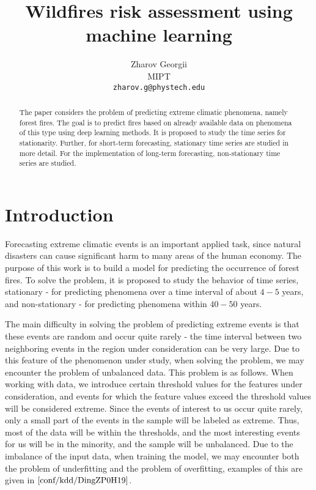 \documentclass{article}
\title{Wildfires risk assessment using machine learning}
\author{ Zharov Georgii\\
MIPT\\
	\texttt{zharov.g@phystech.edu} \\
}
\date{}
\begin{document}
\maketitle

\begin{abstract}



The paper considers the problem of predicting extreme climatic phenomena, namely forest fires. The goal is to predict fires based on already available data on phenomena of this type using deep learning methods. It is proposed to study the time series for stationarity. Further, for short-term forecasting, stationary time series are studied in more detail. For the implementation of long-term forecasting, non-stationary time series are studied.
\end{abstract}



\section{Introduction}


Forecasting extreme climatic events is an important applied task, since natural disasters can cause significant harm to many areas of the human economy. The purpose of this work is to build a model for predicting the occurrence of forest fires. To solve the problem, it is proposed to study the behavior of time series, stationary - for predicting phenomena over a time interval of about $4-5$ years, and non-stationary - for predicting phenomena within $40-50$ years.

The main difficulty in solving the problem of predicting extreme events is that these events are random and occur quite rarely - the time interval between two neighboring events in the region under consideration can be very large. Due to this feature of the phenomenon under study, when solving the problem, we may encounter the problem of unbalanced data. This problem is as follows. When working with data, we introduce certain threshold values for the features under consideration, and events for which the feature values exceed the threshold values will be considered extreme. Since the events of interest to us occur quite rarely, only a small part of the events in the sample will be labeled as extreme. Thus, most of the data will be within the thresholds, and the most interesting events for us will be in the minority, and the sample will be unbalanced. Due to the imbalance of the input data, when training the model, we may encounter both the problem of underfitting and the problem of overfitting, examples of this are given in $\cite{conf/kdd/DingZP0H19}$.
\end{document}
